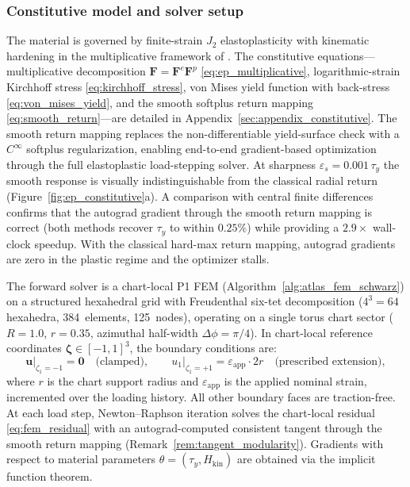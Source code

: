 \documentclass[sort&compress]{svjour3} %
\begin{document}
\subsubsection{Constitutive model and solver setup}
The material is governed by finite-strain $J_2$ elastoplasticity with kinematic hardening in the multiplicative framework of \citet{simo_computational_1998}. The constitutive equations---multiplicative decomposition $\mathbf{F}=\mathbf{F}^e\mathbf{F}^p$ \eqref{eq:ep_multiplicative}, logarithmic-strain Kirchhoff stress \eqref{eq:kirchhoff_stress}, von Mises yield function with back-stress \eqref{eq:von_mises_yield}, and the smooth softplus return mapping \eqref{eq:smooth_return}---are detailed in Appendix~\ref{sec:appendix_constitutive}. The smooth return mapping replaces the non-differentiable yield-surface check with a $C^\infty$ softplus regularization, enabling end-to-end gradient-based optimization through the full elastoplastic load-stepping solver. At sharpness $\varepsilon_s=0.001\,\tau_y$ the smooth response is visually indistinguishable from the classical radial return (Figure~\ref{fig:ep_constitutive}a). A comparison with central finite differences confirms that the autograd gradient through the smooth return mapping is correct (both methods recover $\tau_y$ to within $0.25\%$) while providing a $2.9\times$ wall-clock speedup. With the classical hard-max return mapping, autograd gradients are zero in the plastic regime and the optimizer stalls.

The forward solver is a chart-local P1 FEM (Algorithm~\ref{alg:atlas_fem_schwarz}) on a structured hexahedral grid with Freudenthal six-tet decomposition ($4^3 = 64$ hexahedra, 384~elements, 125~nodes), operating on a single torus chart sector ($R=1.0$, $r=0.35$, azimuthal half-width $\Delta\phi=\pi/4$). In chart-local reference coordinates $\boldsymbol{\zeta}\in[-1,1]^3$, the boundary conditions are:
\begin{equation}
\mathbf{u}\big|_{\zeta_1=-1}=\mathbf{0} \quad\text{(clamped)},
\qquad
u_1\big|_{\zeta_1=+1}=\varepsilon_{\mathrm{app}}\cdot 2r \quad\text{(prescribed extension)},
\label{eq:ep_bc}
\end{equation}
where $r$ is the chart support radius and $\varepsilon_{\mathrm{app}}$ is the applied nominal strain, incremented over the loading history. All other boundary faces are traction-free. At each load step, Newton--Raphson iteration solves the chart-local residual \eqref{eq:fem_residual} with an autograd-computed consistent tangent through the smooth return mapping (Remark~\ref{rem:tangent_modularity}). Gradients with respect to material parameters $\theta=(\tau_y, H_{\mathrm{kin}})$ are obtained via the implicit function theorem.
\end{document}
